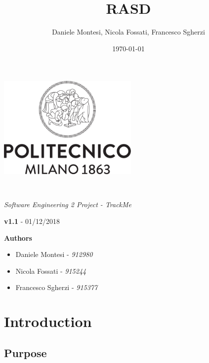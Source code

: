 \documentclass[a4paper,oneside,11pt]{article}
\title{RASD}
\author{Daniele Montesi, Nicola Fossati, Francesco Sgherzi}
\date{\today}
\begin{document}
    \begin{titlingpage} 
        \begin{center}
            \includegraphics[height=5cm]{assets/Logo_Politecnico_Milano.png}\\
            \vspace{4cm}
            \begin{huge} 
                \textbf{\thetitle} \\
            \end{huge}
            \vspace{0.3cm}
            \begin{Large}
                \textit{Software Engineering 2 Project - TrackMe} \\
            \end{Large}
        \end{center}
         \textbf{v1.1} - 01/12/2018 \\

            \vspace{4cm}
             \begin{large}
            \textbf{Authors}
            \begin{itemize}
                \item Daniele Montesi - \textit{912980} 
                \item Nicola Fossati - \textit{915244}
                \item Francesco Sgherzi - \textit{915377}
            \end{itemize}
        \end{large}
    \end{titlingpage}
    \newpage
    \tableofcontents
    \newpage
    \section{Introduction}
    
        \subsection{Purpose}
            
\end{document}
